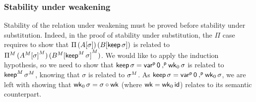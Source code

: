 

  \subsubsection{Stability under weakening}
  Stability of the relation under
  weakening must be proved before stability under substitution.
  Indeed, in the proof of stability under substitution, the $\Pi$ case
  requires to show that $\Pi \,(A[\sigma]) \,(B[\mathsf{keep}\,\sigma])$ is related to
  ${\Pi}^M\,({A}^M{[\sigma]}^M)\,
  ({B}^M{[{\mathsf{keep}}^M\,\sigma]}^M)$.
  We would like to apply the induction hypothesis, so we need to show that
  $\mathsf{keep}\,\sigma={\mathsf{var}}^{\mathsf{p}}\,\mathsf{0}\mathbin{{,}^{\mathsf{p}}}\mathsf{wk}_0\,\sigma$ is related to
  ${\mathsf{keep}}^M\,{\sigma}^M$, knowing that $\sigma$ is
  related to ${\sigma}^M$.
  As $\mathsf{keep}\,\sigma={\mathsf{var}}^{\mathsf{p}}\, \mathsf{0}\mathbin{{,}^{\mathsf{p}}} \mathsf{wk}_0\,\sigma$, we are left with showing that
  $\mathsf{wk}_0\,\sigma=\sigma\circ\mathsf{wk}$ (where $\mathsf{wk}=\mathsf{wk}_0\,\mathsf{id}$)
  relates to its semantic counterpart.





